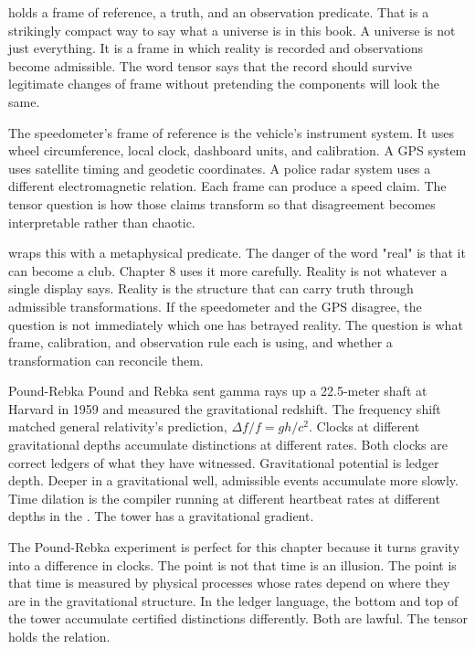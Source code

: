  holds a frame of reference, a truth, and an observation
predicate. That is a strikingly compact way to say what a universe is in this
book. A universe is not just everything. It is a frame in which reality is
recorded and observations become admissible. The word tensor says that the
record should survive legitimate changes of frame without pretending the
components will look the same.

The speedometer's frame of reference is the vehicle's instrument system. It
uses wheel circumference, local clock, dashboard units, and calibration. A GPS
system uses satellite timing and geodetic coordinates. A police radar system
uses a different electromagnetic relation. Each frame can produce a speed
claim. The tensor question is how those claims transform so that disagreement
becomes interpretable rather than chaotic.

 wraps this with a metaphysical predicate. The danger of the word
"real" is that it can become a club. Chapter 8 uses it more carefully. Reality
is not whatever a single display says. Reality is the structure that can carry
truth through admissible transformations. If the speedometer and the GPS
disagree, the question is not immediately which one has betrayed reality. The
question is what frame, calibration, and observation rule each is using, and
whether a transformation can reconcile them.

\begin{gphenom}{Pound-Rebka}
\label{ph:pound-rebka}
\GPhObs Pound and Rebka sent gamma rays up a 22.5-meter shaft at Harvard in
1959 and measured the gravitational redshift. The frequency shift matched
general relativity's prediction, $\Delta f / f = gh/c^2$.
\GPhCon Clocks at different gravitational depths accumulate distinctions at
different rates. Both clocks are correct ledgers of what they have witnessed.
Gravitational potential is ledger depth.
\GPhSeq Deeper in a gravitational well, admissible events accumulate more
slowly. Time dilation is the compiler running at different heartbeat rates at
different depths in the . The tower has a gravitational
gradient.
\end{gphenom}

The Pound-Rebka experiment is perfect for this chapter because it turns
gravity into a difference in clocks. The point is not that time is an illusion.
The point is that time is measured by physical processes whose rates depend on
where they are in the gravitational structure. In the ledger language, the
bottom and top of the tower accumulate certified distinctions differently.
Both are lawful. The tensor holds the relation.


